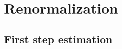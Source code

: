 \section{Renormalization}

\subsection{First step estimation}

\begin{proposition}
    
\end{proposition}